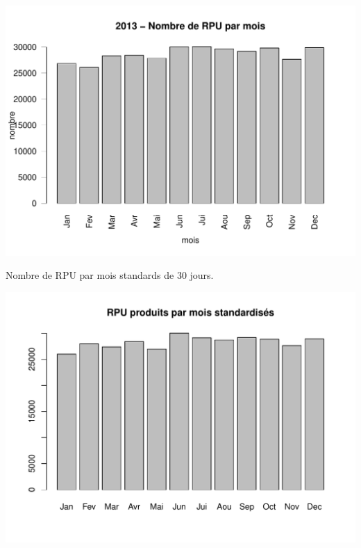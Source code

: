 \documentclass[12pt,english,french,twoside]{book}\usepackage[]{graphicx}\usepackage[]{color}
\makeatletter
\def\maxwidth{ %
  \ifdim\Gin@nat@width>\linewidth
    \linewidth
  \else
    \Gin@nat@width
  \fi
}
\newenvironment{knitrout}{}{} %
\makeatother
\begin{document}
\begin{center}
\begin{knitrout}
\color{fgcolor}
\includegraphics[width=\maxwidth]{figure/bp_parmois-1} 

\end{knitrout}
\label{fig:bp_parmois}
\end{center}

Nombre de RPU par mois standards de 30 jours.

\begin{center}
\begin{knitrout}
\color{fgcolor}
\includegraphics[width=\maxwidth]{figure/mois_nomalise-1} 

\end{knitrout}
\label{fig:bp_parmois_std}
\end{center}
\end{document}

